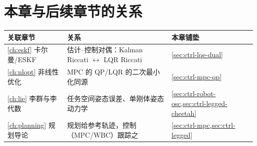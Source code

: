 \section*{本章与后续章节的关系}
\begin{table}[H]\centering\small
\begin{tabular}{lll}
\toprule
关联章节 & 关系 & 本章铺垫 \\
\midrule
\cref{ch:eskf} 卡尔曼/ESKF & 估计--控制对偶：Kalman Riccati $\leftrightarrow$ LQR Riccati & \cref{sec:ctrl-lqe-dual} \\
\cref{ch:nlopt} 非线性优化 & MPC 的 QP/LQR 的二次最小化同源 & \cref{sec:ctrl-mpc-qp} \\
\cref{ch:lie} 李群与李代数 & 任务空间姿态误差、单刚体姿态动力学 & \cref{sec:ctrl-robot-osc,sec:ctrl-legged-cheetah} \\
\cref{ch:planning} 规划导论 & 规划给参考轨迹，控制（MPC/WBC）跟踪之 & \cref{sec:ctrl-mpc,sec:ctrl-legged} \\
\bottomrule
\end{tabular}
\end{table}

